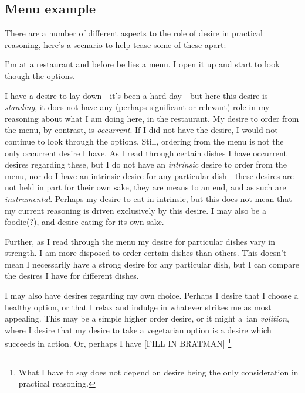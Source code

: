 \documentclass[10pt]{article}
\begin{document}

\newpage


\subsection{Menu example}
\label{sec:menu-example}

There are a number of different aspects to the role of desire in practical reasoning, here's a scenario to help tease some of these apart:

\begin{scenario}
  I'm at a restaurant and before be lies a menu. I open it up and start to look though the options.

  I have a desire to lay down---it's been a hard day---but here this desire is \emph{standing}, it does not have any (perhaps significant or relevant) role in my reasoning about what I am doing here, in the restaurant. My desire to order from the menu, by contrast, is \emph{occurrent}. If I did not have the desire, I would not continue to look through the options. Still, ordering from the menu is not the only occurrent desire I have. As I read through certain dishes I have occurrent desires regarding these, but I do not have an \emph{intrinsic} desire to order from the menu, nor do I have an intrinsic desire for any particular dish---these desires are not held in part for their own sake, they are means to an end, and as such are \emph{instrumental}. Perhaps my desire to eat in intrinsic, but this does not mean that my current reasoning is driven exclusively by this desire. I may also be a foodie(?), and desire eating for its own sake.

  Further, as I read through the menu my desire for particular dishes vary in strength. I am more disposed to order certain dishes than others. This doesn't mean I necessarily have a strong desire for any particular dish, but I can compare the desires I have for different dishes.

  I may also have desires regarding my own choice. Perhaps I desire that I choose a healthy option, or that I relax and indulge in whatever strikes me as most appealing. This may be a simple higher order desire, or it might a~\citeauthor{Frankfurt:1971aa}ian \emph{volition}, where I desire that my desire to take a vegetarian option is a desire which succeeds in action. Or, perhaps I have [FILL IN BRATMAN]\nolinebreak
  \footnote{What I have to say does not depend on desire being the only consideration in practical reasoning.}


\end{scenario}
\end{document}
